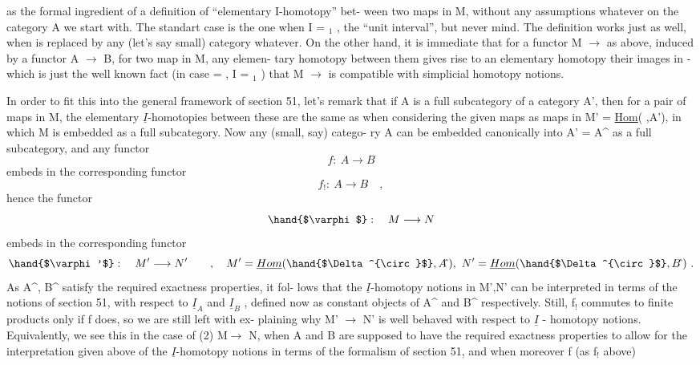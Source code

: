 
as the formal ingredient of a definition of ``elementary I-homotopy'' bet-%
ween two maps in M, without any assumptions whatever on  the category
A we start with. The standart case is the one when I = \hand{$\Delta$}$_1$ , the ``unit
interval'', but never mind. The definition works just as well, when \hand{$\Delta$}
is replaced by any (let's say small) category \hand{$\Delta$} whatever. On the other
hand, it is immediate that for a functor M $\to$  as above, induced by
a functor A $\longrightarrow$ B,  for two map in M, any elemen-%
tary homotopy between them gives rise to an elementary homotopy  their
images in  - which  is just the well known fact (in case \hand{$\Delta$}=\hand{$\Delta$} ,
I = \hand{$\Delta$}$_1$ ) that M $\to$  is compatible with simplicial homotopy notions.

In order to fit this into the general framework of section 51, 
let's remark that if A is a full subcategory of a category A', then for
a pair of maps in M, the elementary $\underline{I}$-homotopies between these are the
same as when considering the given maps as maps in M' = \uline{Hom}(\hand{$\Delta$} ,A'), in
which M is embedded as a full subcategory. Now any (small, say) catego-%
ry A can be embedded canonically into A' = A\^{} as a full subcategory,
and any functor 
\[ f:\ A \to B \]
embeds in the corresponding functor
\[ f_{!} :\ A\hat{} \to B\hat{} \quad , \]
hence the functor
\[ \hand{$\varphi$}:\quad M \longrightarrow N \]
embeds in the corresponding functor
\[ \hand{$\varphi'$}:\quad M' \longrightarrow N' \qquad , \quad M' = \underline{Hom}(\hand{$\Delta^{\circ}$},A\hat{}\,), \ N' = \underline{Hom}(\hand{$\Delta^{\circ}$},B\hat{}\,) \ . \]
 As A\^{}, B\^{} satisfy the required exactness properties, it fol-%
lows that the $\underline{I}$-homotopy notions in M',N' can be interpreted in terms of
the notions of section 51, with respect to $\underline{I}_A$ and $\underline{I}_B$ , 
defined now as  constant objects of A\^{} and B\^{} respectively. Still, f$_{!}$
commutes to finite products only if f does, so we are still left with ex-%
plaining why M' $\to$ N' is well behaved with respect to $\underline{I}$ - homotopy
notions. Equivalently, we   see this in the case of (2) M$\to$ N,
when A and B are supposed to have the required exactness properties to
allow for the interpretation given above of the $\underline{I}$-homotopy notions in
terms of the formalism of section 51, and when moreover f (as f$_{!}$ above)

